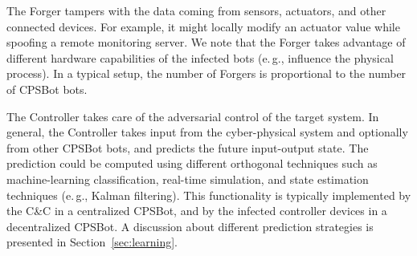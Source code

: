 \documentclass[sigconf]{acmart}
\makeatletter
\newcommand{\Paragraph}[1]{\smallskip\noindent{\bf #1.}}
\newcommand{\eg}{e.\@\,g.,\@\xspace}
\newcommand{\Botnet}{CPSBot\@\xspace}
\newcommand{\CC}{C\&C\@\xspace}
\makeatother
\begin{document}
\Paragraph{Forger} The Forger tampers with the data coming from sensors,
actuators, and other connected devices. For example, it might locally
modify an actuator value while spoofing a remote monitoring server.
We note that the Forger takes advantage of different
hardware capabilities of the infected bots (\eg influence the physical
process). In a typical setup, the number of
Forgers is proportional to the number of \Botnet bots.



\Paragraph{Controller} The Controller takes care of the adversarial
control of the target system. In general, the Controller takes input from the
cyber-physical system and optionally from other \Botnet bots, and predicts the
future input-output state. The prediction could be computed using different
orthogonal techniques such as machine-learning classification, real-time
simulation, and state estimation techniques (\eg Kalman filtering). This 
functionality is typically implemented by the \CC in a centralized \Botnet, and 
by the infected controller devices in a decentralized \Botnet. A discussion 
about different prediction strategies is presented in 
Section~\ref{sec:learning}.

 

\end{document}
